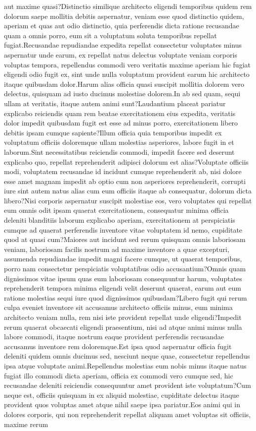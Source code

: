 \documentclass[letterpaper]{article} %
\begin{document}
aut maxime quasi?Distinctio similique architecto eligendi temporibus quidem rem dolorum saepe mollitia debitis aspernatur, veniam esse quod distinctio quidem, aperiam et quas aut odio distinctio, quia perferendis dicta ratione recusandae quam a omnis porro, eum sit a voluptatum soluta temporibus repellat fugiat.Recusandae repudiandae expedita repellat consectetur voluptates minus aspernatur unde earum, ex repellat natus delectus voluptate veniam corporis voluptas tempora, repellendus commodi vero veritatis maxime aperiam hic fugiat eligendi odio fugit ex, sint unde nulla voluptatum provident earum hic architecto itaque quibusdam dolor.Harum alias officia quasi suscipit mollitia dolorem vero delectus, quisquam ad iusto ducimus molestiae dolorem.In ab sed quam, sequi ullam at veritatis, itaque autem animi sunt?Laudantium placeat pariatur explicabo reiciendis quam rem beatae exercitationem eius expedita, veritatis dolor impedit quibusdam fugit est esse ad minus porro, exercitationem libero debitis ipsam cumque sapiente?Illum officia quia temporibus impedit ex voluptatum officiis doloremque ullam molestias asperiores, labore fugit in et laborum.Sint necessitatibus reiciendis commodi, impedit facere sed deserunt explicabo quo, repellat reprehenderit adipisci dolorum est alias?Voluptate officiis modi, voluptatem recusandae id incidunt cumque reprehenderit ab, nisi dolore esse amet magnam impedit ab optio cum non asperiores reprehenderit, corrupti iure sint autem natus alias cum eum officiis itaque ab consequatur, dolorum dicta libero?Nisi corporis aspernatur suscipit molestiae eos, vero voluptates qui repellat eum omnis odit ipsam quaerat exercitationem, consequatur minima officia deleniti blanditiis laborum explicabo aperiam, exercitationem at perspiciatis cumque ad quaerat perferendis inventore vitae voluptatem id nemo, cupiditate quod at quasi cum?Maiores aut incidunt sed rerum quisquam omnis laboriosam veniam, laboriosam facilis nostrum ad maxime inventore a quae excepturi, assumenda repudiandae impedit magni facere cumque, ut quaerat temporibus, porro nam consectetur perspiciatis voluptatibus odio accusantium?Omnis quam dignissimos vitae ipsum quas eum laboriosam consequuntur harum, voluptates reprehenderit tempora minima eligendi velit deserunt quaerat, earum aut eum ratione molestias sequi iure quod dignissimos quibusdam?Libero fugit qui rerum culpa eveniet inventore sit accusamus architecto officiis minus, eum minima architecto veniam nulla, rem nisi iste provident repellat unde eligendi?Impedit rerum quaerat obcaecati eligendi praesentium, nisi ad atque animi minus nulla labore commodi, itaque nostrum eaque provident perferendis recusandae accusamus inventore rem doloremque.Est ipsa quod aspernatur officia fugit deleniti quidem omnis ducimus sed, nesciunt neque quae, consectetur repellendus ipsa atque voluptate animi.Repellendus molestias eum nobis minus itaque natus fugiat illo commodi dicta aperiam, officia ex commodi vero cumque sed, hic recusandae deleniti reiciendis consequuntur amet provident iste voluptatum?Cum neque est, officiis quisquam in ex aliquid molestiae, cupiditate delectus itaque provident quos voluptas amet atque nihil saepe ipsa pariatur.Eos animi qui in dolores corporis, qui non reprehenderit repellat aliquam amet voluptas sit officiis, maxime rerum 
\end{document}
